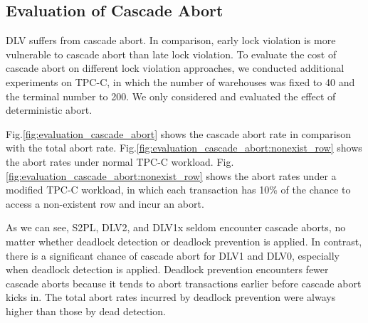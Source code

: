 \documentclass[conference]{IEEEtran}
\begin{document}
\subsection{Evaluation of Cascade Abort}
DLV suffers from cascade abort. In comparison, early lock violation is more vulnerable to cascade abort than
late lock violation.
To evaluate the cost of cascade abort on different lock violation approaches, we conducted additional experiments on TPC-C, in which the number of warehouses was fixed to 40  and the terminal number to 200.
We only considered and evaluated the effect of deterministic abort.

Fig.\ref{fig:evaluation_cascade_abort} shows the cascade abort rate in comparison with the total abort rate.
Fig.\ref{fig:evaluation_cascade_abort:nonexist_row}
shows the abort rates under normal TPC-C workload.
Fig.\ref{fig:evaluation_cascade_abort:nonexist_row} 
shows the abort rates under a modified TPC-C workload, in which each transaction has 10\% of the chance to access a non-existent row and incur an abort. 
 
As we can see, S2PL, DLV2, and DLV1x seldom encounter cascade aborts, no matter whether deadlock detection or deadlock prevention is applied. 
In contrast, there is a significant chance of cascade abort for DLV1 and DLV0, especially when deadlock detection is applied. Deadlock prevention encounters fewer cascade aborts because it tends to abort transactions earlier before cascade abort kicks in. The total abort rates incurred by deadlock prevention were always higher than those by dead detection.

\end{document}
